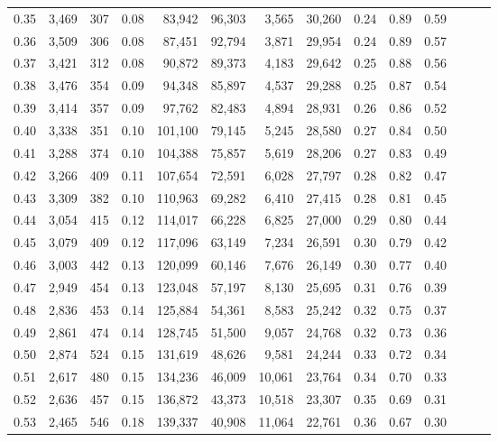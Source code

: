 \begin{tabular}{rrrrrrrrrrrrrr}
0.35 &  3,469 &  307 &  0.08 &   83,942 &   96,303 &   3,565 &  30,260 &  0.24 &  0.89 &      0.59 \\
0.36 &  3,509 &  306 &  0.08 &   87,451 &   92,794 &   3,871 &  29,954 &  0.24 &  0.89 &      0.57 \\
0.37 &  3,421 &  312 &  0.08 &   90,872 &   89,373 &   4,183 &  29,642 &  0.25 &  0.88 &      0.56 \\
0.38 &  3,476 &  354 &  0.09 &   94,348 &   85,897 &   4,537 &  29,288 &  0.25 &  0.87 &      0.54 \\
0.39 &  3,414 &  357 &  0.09 &   97,762 &   82,483 &   4,894 &  28,931 &  0.26 &  0.86 &      0.52 \\
0.40 &  3,338 &  351 &  0.10 &  101,100 &   79,145 &   5,245 &  28,580 &  0.27 &  0.84 &      0.50 \\
0.41 &  3,288 &  374 &  0.10 &  104,388 &   75,857 &   5,619 &  28,206 &  0.27 &  0.83 &      0.49 \\
0.42 &  3,266 &  409 &  0.11 &  107,654 &   72,591 &   6,028 &  27,797 &  0.28 &  0.82 &      0.47 \\
0.43 &  3,309 &  382 &  0.10 &  110,963 &   69,282 &   6,410 &  27,415 &  0.28 &  0.81 &      0.45 \\
0.44 &  3,054 &  415 &  0.12 &  114,017 &   66,228 &   6,825 &  27,000 &  0.29 &  0.80 &      0.44 \\
0.45 &  3,079 &  409 &  0.12 &  117,096 &   63,149 &   7,234 &  26,591 &  0.30 &  0.79 &      0.42 \\
0.46 &  3,003 &  442 &  0.13 &  120,099 &   60,146 &   7,676 &  26,149 &  0.30 &  0.77 &      0.40 \\
0.47 &  2,949 &  454 &  0.13 &  123,048 &   57,197 &   8,130 &  25,695 &  0.31 &  0.76 &      0.39 \\
0.48 &  2,836 &  453 &  0.14 &  125,884 &   54,361 &   8,583 &  25,242 &  0.32 &  0.75 &      0.37 \\
0.49 &  2,861 &  474 &  0.14 &  128,745 &   51,500 &   9,057 &  24,768 &  0.32 &  0.73 &      0.36 \\
0.50 &  2,874 &  524 &  0.15 &  131,619 &   48,626 &   9,581 &  24,244 &  0.33 &  0.72 &      0.34 \\
0.51 &  2,617 &  480 &  0.15 &  134,236 &   46,009 &  10,061 &  23,764 &  0.34 &  0.70 &      0.33 \\
0.52 &  2,636 &  457 &  0.15 &  136,872 &   43,373 &  10,518 &  23,307 &  0.35 &  0.69 &      0.31 \\
0.53 &  2,465 &  546 &  0.18 &  139,337 &   40,908 &  11,064 &  22,761 &  0.36 &  0.67 &      0.30 \\

\end{tabular}
